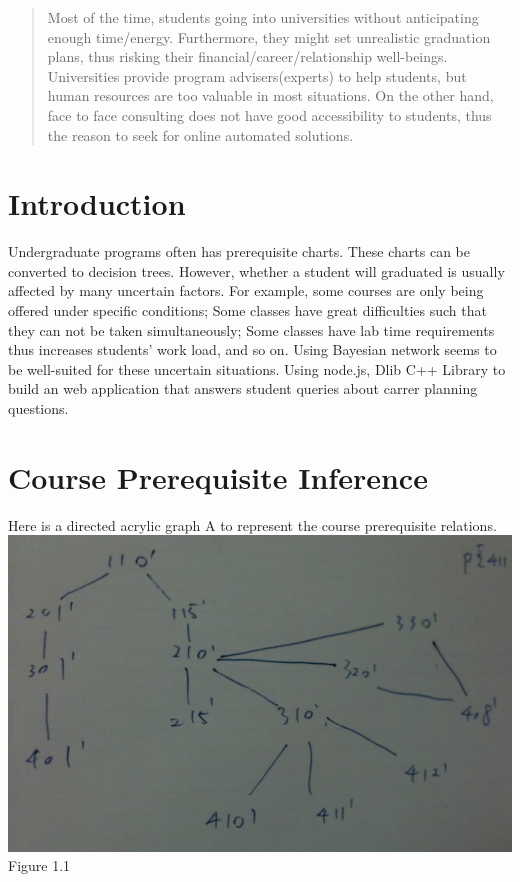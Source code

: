 \documentclass[12pt]{article}
\begin{document}
\maketitle

\begin{abstract}
Most of the time, students going into universities without anticipating enough time/energy. Furthermore, they might set unrealistic graduation plans, thus risking their financial/career/relationship well-beings. Universities provide program advisers(experts) to help students, but human resources are too valuable in most situations. On the other hand, face to face consulting does not have good accessibility to students, thus the reason to seek for online automated solutions.
\end{abstract}



\section{Introduction}
Undergraduate programs often has prerequisite charts. These charts can be converted to decision trees. However, whether a student will graduated is usually affected by many uncertain factors. For example, some courses are only being offered under specific conditions; Some classes have great difficulties such that they can not be taken simultaneously; Some classes have lab time requirements thus increases students’ work load, and so on. Using Bayesian network seems to be well-suited for these uncertain situations.
Using node.js, Dlib C++ Library to build an web application that answers student queries about carrer planning questions.

\section{Course Prerequisite Inference}\label{Course Prerequisite Inference}
Here is a directed acrylic graph A to represent the course prerequisite relations.\\
\includegraphics[scale=0.3]{g1_1.jpg}\\
Figure 1.1
\end{document}
